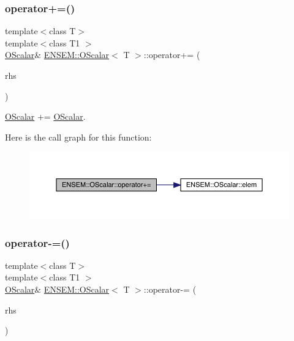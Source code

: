 \subsubsection{\texorpdfstring{operator+=()}{operator+=()}\hspace{0.1cm}{\footnotesize\ttfamily [3/3]}}
{\footnotesize\ttfamily template$<$class T$>$ \\
template$<$class T1 $>$ \\
\mbox{\hyperlink{classENSEM_1_1OScalar}{O\+Scalar}}\& \mbox{\hyperlink{classENSEM_1_1OScalar}{E\+N\+S\+E\+M\+::\+O\+Scalar}}$<$ T $>$\+::operator+= (\begin{DoxyParamCaption}\item[{const \mbox{\hyperlink{classENSEM_1_1OScalar}{O\+Scalar}}$<$ T1 $>$ \&}]{rhs }\end{DoxyParamCaption})\hspace{0.3cm}{\ttfamily [inline]}}



\mbox{\hyperlink{classENSEM_1_1OScalar}{O\+Scalar}} += \mbox{\hyperlink{classENSEM_1_1OScalar}{O\+Scalar}}. 

Here is the call graph for this function\+:
\nopagebreak
\begin{figure}[H]
\begin{center}
\leavevmode
\includegraphics[width=350pt]{da/d80/classENSEM_1_1OScalar_a3109a05113cade86410bc77f60812023_cgraph}
\end{center}
\end{figure}
\mbox{\label{classENSEM_1_1OScalar_a4d240e95768b5a0c9537b32d00d60ac5}} 
\subsubsection{\texorpdfstring{operator-\/=()}{operator-=()}\hspace{0.1cm}{\footnotesize\ttfamily [1/3]}}
{\footnotesize\ttfamily template$<$class T$>$ \\
template$<$class T1 $>$ \\
\mbox{\hyperlink{classENSEM_1_1OScalar}{O\+Scalar}}\& \mbox{\hyperlink{classENSEM_1_1OScalar}{E\+N\+S\+E\+M\+::\+O\+Scalar}}$<$ T $>$\+::operator-\/= (\begin{DoxyParamCaption}\item[{const \mbox{\hyperlink{classENSEM_1_1OScalar}{O\+Scalar}}$<$ T1 $>$ \&}]{rhs }\end{DoxyParamCaption})\hspace{0.3cm}{\ttfamily [inline]}}



